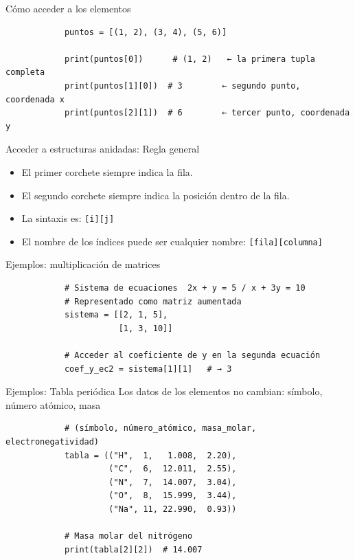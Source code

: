 \documentclass{beamer}
\begin{document}
    \begin{frame}[fragile, t]{Cómo acceder a los elementos}
        \begin{verbatim}
            puntos = [(1, 2), (3, 4), (5, 6)]
            
            print(puntos[0])      # (1, 2)   ← la primera tupla completa
            print(puntos[1][0])  # 3        ← segundo punto, coordenada x
            print(puntos[2][1])  # 6        ← tercer punto, coordenada y
            \end{verbatim}
    \end{frame}

    \begin{frame}[fragile, t]{Acceder a estructuras anidadas: Regla general}
        \begin{itemize}
            \item El primer corchete siempre indica la fila.
            \item El segundo corchete siempre indica la posición dentro de la fila.
            \item La sintaxis es: \texttt{[i][j]}
            \item El nombre de los índices puede ser cualquier nombre: \texttt{[fila][columna]} 
        \end{itemize}
    \end{frame}

    \begin{frame}[fragile, t]{Ejemplos: multiplicación de matrices}
        \begin{verbatim}
            # Sistema de ecuaciones  2x + y = 5 / x + 3y = 10
            # Representado como matriz aumentada
            sistema = [[2, 1, 5],
                       [1, 3, 10]]
            
            # Acceder al coeficiente de y en la segunda ecuación
            coef_y_ec2 = sistema[1][1]   # → 3
        \end{verbatim}
    \end{frame}

    \begin{frame}[fragile, t]{Ejemplos: Tabla periódica}
        Los datos de los elementos no cambian: símbolo, número atómico, masa
        \begin{verbatim}
            # (símbolo, número_atómico, masa_molar, electronegatividad)
            tabla = (("H",  1,   1.008,  2.20),
                     ("C",  6,  12.011,  2.55),
                     ("N",  7,  14.007,  3.04),
                     ("O",  8,  15.999,  3.44),
                     ("Na", 11, 22.990,  0.93))
    
            # Masa molar del nitrógeno
            print(tabla[2][2])  # 14.007
        \end{verbatim}
    \end{frame}
\end{document}
